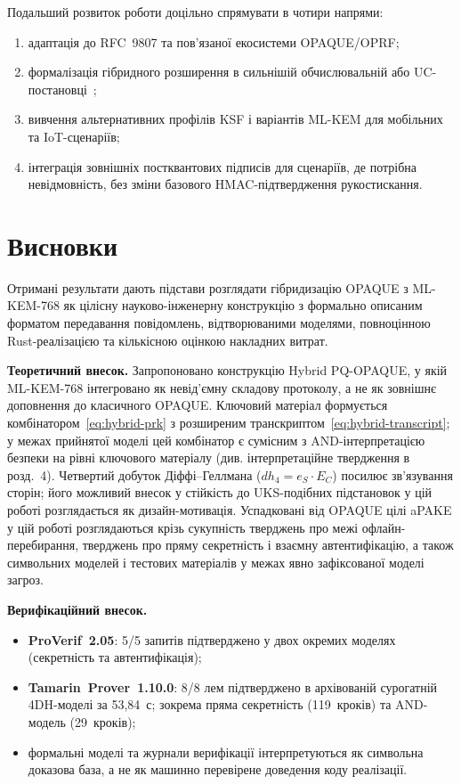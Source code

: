 \documentclass{llncs}
\begin{document}
Подальший розвиток роботи доцільно спрямувати в чотири напрями:
\begin{enumerate}
  \item адаптація до RFC~9807 та пов'язаної екосистеми OPAQUE/OPRF;
  \item формалізація гібридного розширення в сильнішій обчислювальній або
        UC-постановці~\cite{canetti2001};
  \item вивчення альтернативних профілів KSF і варіантів ML-KEM для
        мобільних та IoT-сценаріїв;
  \item інтеграція зовнішніх постквантових підписів для сценаріїв, де
        потрібна невідмовність, без зміни базового HMAC-підтвердження
        рукостискання.
\end{enumerate}

\section{Висновки}

Отримані результати дають підстави розглядати гібридизацію OPAQUE з
ML-KEM-768 як цілісну науково-інженерну конструкцію з формально
описаним форматом передавання повідомлень, відтворюваними моделями,
повноцінною Rust-реалізацією та кількісною оцінкою накладних витрат.

\textbf{Теоретичний внесок.} Запропоновано конструкцію Hybrid
PQ-OPAQUE, у якій ML-KEM-768 інтегровано як невід'ємну складову
протоколу, а не як зовнішнє доповнення до класичного OPAQUE. Ключовий
матеріал формується комбінатором~\eqref{eq:hybrid-prk} з розширеним
транскриптом~\eqref{eq:hybrid-transcript}; у межах прийнятої моделі цей комбінатор є сумісним з
AND-інтерпретацією безпеки на рівні ключового матеріалу
(див. інтерпретаційне твердження в розд.~4).
Четвертий добуток Діффі--Геллмана ($dh_4 = e_S \cdot E_C$)
посилює зв'язування сторін; його можливий внесок у стійкість до
UKS-подібних підстановок у цій роботі розглядається як дизайн-мотивація.
Успадковані від OPAQUE цілі aPAKE у цій роботі розглядаються крізь
сукупність тверджень про межі офлайн-перебирання, тверджень про пряму
секретність і взаємну автентифікацію, а також символьних моделей і
тестових матеріалів у межах явно зафіксованої моделі загроз.

\textbf{Верифікаційний внесок.}
\begin{itemize}
  \item \textbf{ProVerif~2.05}: 5/5 запитів підтверджено у двох
        окремих моделях (секретність та автентифікація);
  \item \textbf{Tamarin~Prover~1.10.0}: 8/8 лем підтверджено в
        архівованій сурогатній 4DH-моделі за 53,84~с; зокрема
        пряма секретність (119~кроків) та AND-модель (29~кроків);
  \item формальні моделі та журнали верифікації інтерпретуються як
        символьна доказова база,
        а не як машинно перевірене доведення коду реалізації.
\end{itemize}
\end{document}
